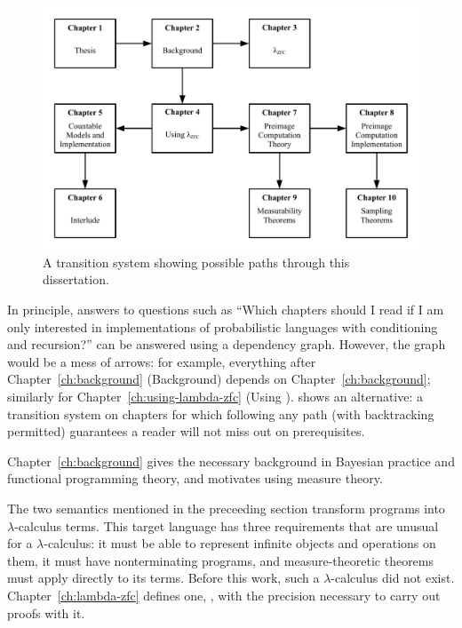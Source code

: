 \begin{figure}[!tb]\centering
\includegraphics[width=\textwidth]{figures/reading-graph}
\caption[A transition system for reading this dissertation]{A transition system showing possible paths through this dissertation.}
\label{fig:reading-graph}
\end{figure}

In principle, answers to questions such as ``Which chapters should I read if I am only interested in implementations of probabilistic languages with conditioning and recursion?'' can be answered using a dependency graph.
However, the graph would be a mess of arrows: for example, everything after Chapter~\ref{ch:background} (Background) depends on Chapter~\ref{ch:background}; similarly for Chapter~\ref{ch:using-lambda-zfc} (Using \lzfclang).
 shows an alternative: a transition system on chapters for which following any path (with backtracking permitted) guarantees a reader will not miss out on prerequisites.

Chapter~\ref{ch:background} gives the necessary background in Bayesian practice and functional programming theory, and motivates using measure theory.

The two semantics mentioned in the preceeding section transform programs into $\lambda$-calculus terms.
This target language has three requirements that are unusual for a $\lambda$-calculus: it must be able to represent infinite objects and operations on them, it must have nonterminating programs, and measure-theoretic theorems must apply directly to its terms.
Before this work, such a $\lambda$-calculus did not exist.
Chapter~\ref{ch:lambda-zfc} defines one, \lzfclang, with the precision necessary to carry out proofs with it.

